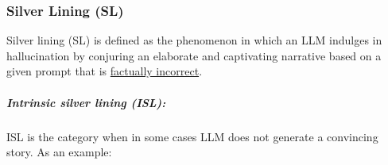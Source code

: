 \subsubsection{Silver Lining (SL)} Silver lining (SL)
is defined as the phenomenon in which an LLM indulges in hallucination by conjuring an elaborate and captivating narrative based on a given prompt that is \ul{factually incorrect}. 
\vspace{-1mm}
\subparagraph{Intrinsic silver lining (ISL):} \hspace{0pt} ISL is the category when in some cases LLM does not generate a convincing story. As an example: %
\vspace{-4mm}
